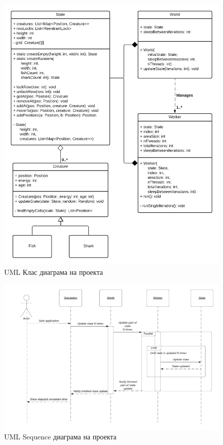 \documentclass{article}
\begin{document}
\begin{figure}[H]
	\centering
	\includegraphics[width=1.2\textwidth]{classes-uml.png}
	\caption{UML Клас диаграма на проекта}
\end{figure}

\newpage
\hspace{0pt}

\vfill

\begin{figure}[H]
	\centering
	\includegraphics[width=1\textwidth]{sequence.png}
	\caption{UML Sequence диаграма на проекта}
\end{figure}
\end{document}
